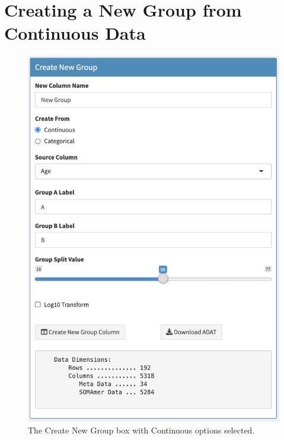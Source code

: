\documentclass[
]{book}
\begin{document}
\hypertarget{creating-a-new-group-from-continuous-data}{%
\section{Creating a New Group from Continuous Data}\label{creating-a-new-group-from-continuous-data}}

\begin{figure}
\centering
\includegraphics{images/CreateGroup_Continuous.png}
\caption{The Create New Group box with Continuous options selected.}
\end{figure}
\end{document}
